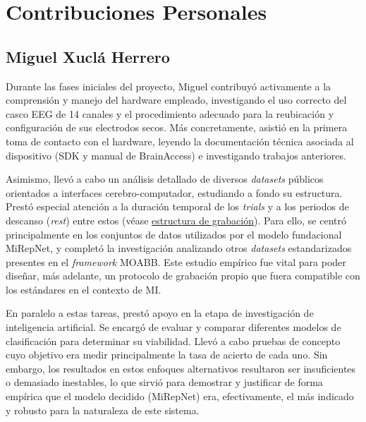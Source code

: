 \chapter*{Contribuciones Personales}
\label{cap:contribucionesPersonales}

\section*{Miguel Xuclá Herrero}
Durante las fases iniciales del proyecto, Miguel contribuyó activamente a la comprensión y manejo del hardware empleado, investigando el uso correcto del casco EEG de 14 canales y el procedimiento adecuado para la reubicación y configuración de sus electrodos secos. Más concretamente, asistió en la primera toma de contacto con el hardware, leyendo la documentación técnica asociada al dispositivo (SDK y manual de BrainAccess) e investigando trabajos anteriores.

Asimismo, llevó a cabo un análisis detallado de diversos \textit{datasets} públicos orientados a interfaces cerebro-computador, estudiando a fondo su estructura. Prestó especial atención a la duración temporal de los \textit{trials} y a los periodos de descanso (\textit{rest}) entre estos (véase \hyperref[subsec:estructuraGrabacion]{estructura de grabación}). Para ello, se centró principalmente en los conjuntos de datos utilizados por el modelo fundacional MiRepNet, y completó la investigación analizando otros \textit{datasets} estandarizados presentes en el \textit{framework} MOABB. Este estudio empírico fue vital para poder diseñar, más adelante, un protocolo de grabación propio que fuera compatible con los estándares en el contexto de MI.

En paralelo a estas tareas, prestó apoyo en la etapa de investigación de inteligencia artificial. Se encargó de evaluar y comparar diferentes modelos de clasificación para determinar su viabilidad. Llevó a cabo pruebas de concepto cuyo objetivo era medir principalmente la tasa de acierto de cada uno. Sin embargo, los resultados en estos enfoques alternativos resultaron ser insuficientes o demasiado inestables, lo que sirvió para demostrar y justificar de forma empírica que el modelo decidido (MiRepNet) era, efectivamente, el más indicado y robusto para la naturaleza de este sistema.

